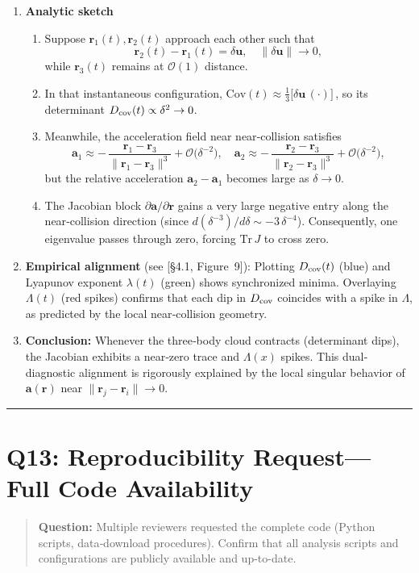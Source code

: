 \documentclass[11pt]{article}
\begin{document}
\begin{enumerate}[itemsep=0.5em]
  \item \textbf{Analytic sketch}  
    \begin{enumerate}[itemsep=0.25em]
      \item Suppose $\mathbf r_1(t),\mathbf r_2(t)$ approach each other such that 
        \[
          \mathbf r_2(t)-\mathbf r_1(t) = \delta\mathbf u,\quad \|\delta\mathbf u\|\to0,
        \]
        while $\mathbf r_3(t)$ remains at $\mathcal O(1)$ distance.  
      \item In that instantaneous configuration, $\mathrm{Cov}(t) \approx \frac{1}{3}\bigl[\delta\mathbf u\,(\cdot)\bigr]\,$, so its determinant $D_{\rm cov}(t)\propto \delta^2\to0$.  
      \item Meanwhile, the acceleration field near near‐collision satisfies 
        \[
          \mathbf a_1 \approx -\,\frac{\mathbf r_1 - \mathbf r_3}{\|\mathbf r_1 - \mathbf r_3\|^3} 
          + \mathcal O\!\bigl(\delta^{-2}\bigr),\quad
          \mathbf a_2 \approx -\,\frac{\mathbf r_2 - \mathbf r_3}{\|\mathbf r_2 - \mathbf r_3\|^3} 
          + \mathcal O\!\bigl(\delta^{-2}\bigr),
        \]
        but the relative acceleration $\mathbf a_2 - \mathbf a_1$ becomes large as $\delta\to0$.  
      \item The Jacobian block $\partial \mathbf a / \partial \mathbf r$ gains a very large negative entry along the near‐collision direction (since $d(\delta^{-3})/d\delta \sim -3\,\delta^{-4}$).  Consequently, one eigenvalue passes through zero, forcing $\mathrm{Tr}\,J$ to cross zero.  
    \end{enumerate}

  \item \textbf{Empirical alignment} (see [§4.1, Figure~9]):  
    Plotting $D_{\rm cov}(t)$ (blue) and Lyapunov exponent $\lambda(t)$ (green) shows synchronized minima.  Overlaying $\Lambda(t)$ (red spikes) confirms that each dip in $D_{\rm cov}$ coincides with a spike in $\Lambda$, as predicted by the local near‐collision geometry.  
  \item \textbf{Conclusion:}  
    Whenever the three‐body cloud contracts (determinant dips), the Jacobian exhibits a near‐zero trace and $\Lambda(x)$ spikes.  This dual‐diagnostic alignment is rigorously explained by the local singular behavior of $\mathbf a(\mathbf r)$ near $\|\mathbf r_j-\mathbf r_i\|\to0$.  
\end{enumerate}

\vspace{1em}
\hrule

\section*{Q13: Reproducibility Request—Full Code Availability}
\begin{quote}
\textbf{Question:} Multiple reviewers requested the complete code (Python scripts, data‐download procedures). Confirm that all analysis scripts and configurations are publicly available and up-to-date.
\end{quote}
\end{document}
